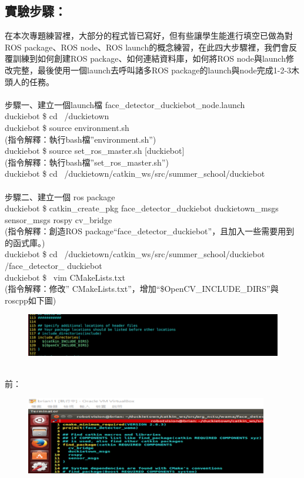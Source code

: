 \documentclass{article}
\begin{document}
\subsection{實驗步驟：}
在本次專題練習裡，大部分的程式皆已寫好，但有些讓學生能進行填空已做為對ROS package、ROS node、ROS launch的概念練習，在此四大步驟裡，我們會反覆訓練到如何創建ROS package、如何連結資料庫，如何將ROS node與launch修改完整，最後使用一個launch去呼叫諸多ROS package的launch與node完成1-2-3木頭人的任務。
\\\\步驟一、建立一個launch檔 face\_detector\_duckiebot\_node.launch
\\duckiebot \$ cd ~/duckietown
\\duckiebot \$ source environment.sh
\\(指令解釋：執行bash檔”environment.sh”)
\\duckiebot \$ source set\_ros\_master.sh [duckiebot]
\\(指令解釋：執行bash檔”set\_ros\_master.sh”)
\\duckiebot \$ cd ~/duckietown/catkin\_ws/src/summer\_school/duckiebot
\\\\步驟二、建立一個 ros package
\\duckiebot \$ catkin\_create\_pkg face\_detector\_duckiebot duckietown\_msgs sensor\_msgs rospy cv\_bridge
\\(指令解釋：創造ROS package“face\_detector\_duckiebot”，且加入一些需要用到的函式庫。)
\\duckiebot \$ cd ~/duckietown/catkin\_ws/src/summer\_school/duckiebot /face\_detector\_ duckiebot
\\duckiebot \$  vim CMakeLists.txt 
\\(指令解釋：修改” CMakeLists.txt”，增加“\${OpenCV\_INCLUDE\_DIRS}”與roscpp如下圖)
\begin{figure}[htp]
    \begin{center}
        \includegraphics[width=400pt]{pic/5_3_2.png}
    \end{center}
\end{figure}
\\
前：
\begin{figure}[htp]
    \begin{center}
        \includegraphics[width=300pt]{pic/5_3_3.png}
    \end{center}
\end{figure}
\end{document}
